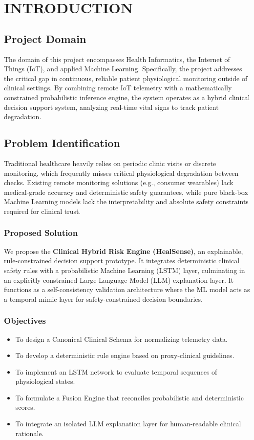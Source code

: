 \documentclass[12pt,a4paper]{report}
\begin{document}
\chapter{INTRODUCTION}

\section{Project Domain}
The domain of this project encompasses Health Informatics, the Internet of Things (IoT), and applied Machine Learning. Specifically, the project addresses the critical gap in continuous, reliable patient physiological monitoring outside of clinical settings. By combining remote IoT telemetry with a mathematically constrained probabilistic inference engine, the system operates as a hybrid clinical decision support system, analyzing real-time vital signs to track patient degradation.

\section{Problem Identification}
Traditional healthcare heavily relies on periodic clinic visits or discrete monitoring, which frequently misses critical physiological degradation between checks. Existing remote monitoring solutions (e.g., consumer wearables) lack medical-grade accuracy and deterministic safety guarantees, while pure black-box Machine Learning models lack the interpretability and absolute safety constraints required for clinical trust. 

\subsection{Proposed Solution}
We propose the \textbf{Clinical Hybrid Risk Engine (HealSense)}, an explainable, rule-constrained decision support prototype. It integrates deterministic clinical safety rules with a probabilistic Machine Learning (LSTM) layer, culminating in an explicitly constrained Large Language Model (LLM) explanation layer. It functions as a self-consistency validation architecture where the ML model acts as a temporal mimic layer for safety-constrained decision boundaries.

\subsection{Objectives}
\begin{itemize}
    \item To design a Canonical Clinical Schema for normalizing telemetry data.
    \item To develop a deterministic rule engine based on proxy-clinical guidelines.
    \item To implement an LSTM network to evaluate temporal sequences of physiological states.
    \item To formulate a Fusion Engine that reconciles probabilistic and deterministic scores.
    \item To integrate an isolated LLM explanation layer for human-readable clinical rationale.
\end{itemize}
\end{document}
